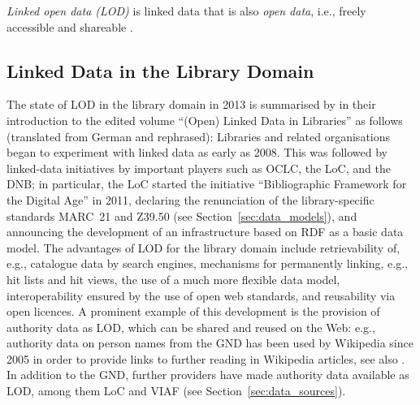 \par\medskip
\emph{Linked open data (LOD)} is linked data that is also \emph{open data},
i.e., freely accessible and shareable \autocite{WikiLinkedData}.




\subsection{Linked Data in the Library Domain}

The state of LOD in the library domain in 2013 is summarised by \textcite{Pohl2013}
in their introduction to the edited volume \enquote{(Open) Linked Data in Libraries} \autocite{Danowski2013}
as follows (translated from German and rephrased): Libraries and related organisations
began to experiment with linked data as early as 2008.
This was followed by linked-data initiatives by important players such as
OCLC, the \gls{LoC}, and the \gls{DNB};
in particular, the \gls{LoC} started the initiative \enquote{Bibliographic Framework for the Digital Age} in 2011,
%
%
declaring the renunciation of the library-specific standards \gls{MARC}~21 and \gls{Z39.50} (see Section~\ref{sec:data_models}),
and announcing the development of an infrastructure based on \gls{RDF} as a basic data model. The advantages of LOD for the library domain include
retrievability of, e.g., catalogue data by search engines,
mechanisms for permanently linking, e.g., hit lists and hit views,
the use of a much more flexible data model,
interoperability ensured by the use of open web standards,
and reusability via open licences.
A prominent example of this development is the provision of authority data as LOD,
which can be shared and reused on the Web:
e.g., authority data on person names from the \gls{GND} has been used by Wikipedia since 2005
in order to provide links to further reading in Wikipedia articles, see also \autocite{Hengel2005}.
In addition to the \gls{GND}, further providers have made authority data available as LOD,
among them \gls{LoC} and \gls{VIAF} (see Section~\ref{sec:data_sources}).

